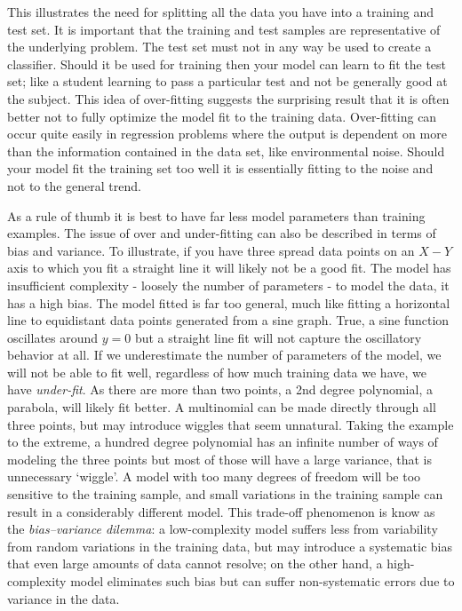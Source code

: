 This illustrates the need for splitting all the data you have into a training and test set.
It is important that the training and test samples are representative of the underlying problem.
The test set must not in any way be used to create a classifier.
Should it be used for training then your model can learn to fit the test set; like a student learning to pass a particular test and not be generally good at the subject.
This idea of over-fitting suggests the surprising result that it is often better not to fully optimize the model fit to the training data.
Over-fitting can occur quite easily in regression problems where the output is dependent on more than the information contained in the data set, like environmental noise.
Should your model fit the training set too well it is essentially fitting to the noise and not to the general trend.

As a rule of thumb it is best to have far less model parameters than training examples.
The issue of over and under-fitting can also be described in terms of bias and variance.
To illustrate, if you have three spread data points on an $X-Y$ axis to which you fit a straight line it will likely not be a good fit.
The model has insufficient complexity - loosely the number of parameters - to model the data, it has a high bias.
The model fitted is far too general, much like fitting a horizontal line to equidistant data points generated from a sine graph.
True, a sine function oscillates around $y=0$ but a straight line fit will not capture the oscillatory behavior at all. 
If we underestimate the number of parameters of the model, we will not be able to fit well, regardless of how much training data we have, we have \textit{under-fit}.
As there are more than two points, a 2nd degree polynomial, a parabola, will likely fit better.
A multinomial can be made directly through all three points, but may introduce wiggles that seem unnatural.
Taking the example to the extreme, a hundred degree polynomial has an infinite number of ways of modeling the three points but most of those will have a large variance, that is unnecessary `wiggle'.
A model with too many degrees of freedom will be too sensitive to the training sample, and small variations in the training sample can result in a considerably different model. 
This trade-off phenomenon is know as the \textit{bias–variance dilemma}: a low-complexity model suffers less from variability from random variations in the training data, but may introduce a systematic bias that even large amounts of data cannot resolve; on the other hand, a high-complexity model eliminates such bias but can suffer non-systematic errors due to variance in the data.

